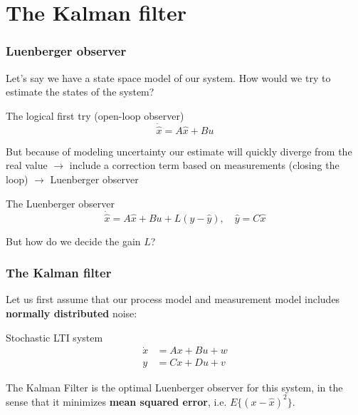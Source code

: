 \documentclass{beamer}
\begin{document}

\section{The Kalman filter}

\begin{frame}
    \frametitle{Luenberger observer}
    Let's say we have a state space model of our system. How would we try to estimate the states of the system? 

    \begin{block}{The logical first try (open-loop observer)}
        \begin{equation}
            \dot{\hat{x}} = A \hat{x} + B u 
        \end{equation}
    \end{block}

    But because of modeling uncertainty our estimate will quickly diverge from the real value $\rightarrow$ include a correction term based on measurements (closing the loop) $\rightarrow$ Luenberger observer

    \begin{block}{The Luenberger observer}
        \begin{equation}
            \dot{\hat{x}} = A \hat{x} + B u + L (y - \hat{y}), \quad \hat{y} = C \hat{x}
        \end{equation}
    \end{block}
    But how do we decide the gain $L$?
\end{frame}


\begin{frame}
    \frametitle{The Kalman filter}
    Let us first assume that our process model and measurement model includes \textbf{normally distributed} noise:
    \begin{block}{Stochastic LTI system}
        \begin{equation}
            \begin{aligned}
                \dot{x} &= A x + B u + w \\
                y &=C x + D u + v
            \end{aligned}
        \end{equation}
    \end{block}
    The Kalman Filter is the optimal Luenberger observer for this system, in the sense that it minimizes \textbf{mean squared error}, i.e. $E\{(x-\hat{x})^2\}$. 
\end{frame}
\end{document}
